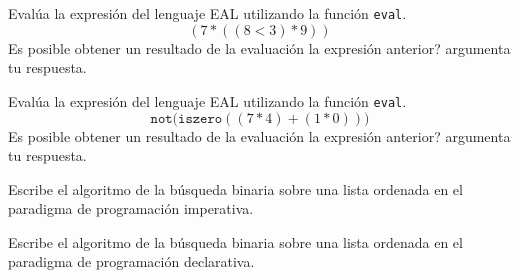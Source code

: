     \begin{exercise}
        Evalúa la expresión del lenguaje \textsf{EAL} utilizando la función \texttt{eval}. \\ 
        $$(7 * ((8 < 3) * 9))$$
	  Es posible obtener un resultado de la evaluación la expresión anterior? argumenta tu respuesta.
    \end{exercise}


    \begin{exercise}
        Evalúa la expresión del lenguaje \textsf{EAL} utilizando la función \texttt{eval}. \\ 
            $$\texttt{not(iszero}( (7 * 4) + (1 * 0)))$$
 Es posible obtener un resultado de la evaluación la expresión anterior? argumenta tu respuesta.
    \end{exercise}


    \begin{exercise}
        Escribe el algoritmo de la búsqueda binaria sobre una lista ordenada en el paradigma de programación imperativa.
    \end{exercise}

    \begin{exercise}
        Escribe el algoritmo de la búsqueda binaria sobre una lista ordenada en el paradigma de programación declarativa.
    \end{exercise}



